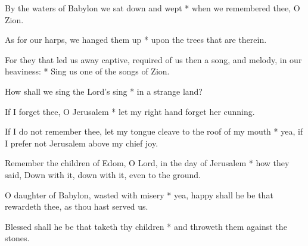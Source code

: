 \begin{multicols}{2}
	
	By the waters of Babylon we sat down and wept * when we remembered thee, O Zion.
	
	As for our harps, we hanged them up * upon the trees that are therein.
	
	For they that led us away captive, required of us then a song, and melody, in our heaviness: * Sing us one of the songs of Zion.
	
	How shall we sing the Lord's sing * in a strange land?
	
	If I forget thee, O Jerusalem * let my right hand forget her cunning.
	
	If I do not remember thee, let my tongue cleave to the roof of my mouth * yea, if I prefer not Jerusalem above my chief joy.
	
	Remember the children of Edom, O Lord, in the day of Jerusalem * how they said, Down with it, down with it, even to the ground.
	
	O daughter of Babylon, wasted with misery * yea, happy shall he be that rewardeth thee, as thou hast served us.
	
	Blessed shall he be that taketh thy children * and throweth them against the stones.
	
	\gloria{}
\end{multicols}